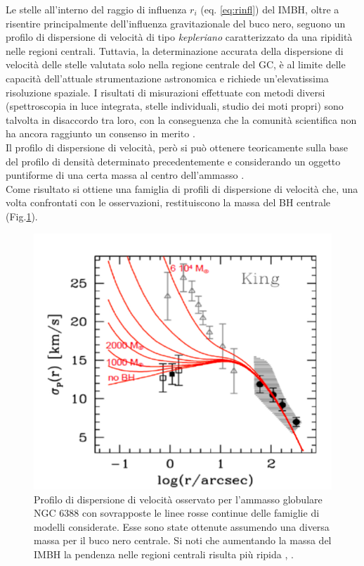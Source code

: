 Le stelle all’interno del raggio di influenza $r_{i}$ (eq. \ref{eq:rinfl}) del IMBH, oltre a risentire principalmente dell’influenza gravitazionale del buco nero, seguono un profilo di dispersione di velocità di tipo \textit{kepleriano} caratterizzato da una ripidità nelle regioni centrali. Tuttavia, la determinazione accurata della dispersione di velocità delle stelle valutata solo nella regione centrale del GC, è al limite delle capacità dell’attuale strumentazione astronomica e richiede un’elevatissima risoluzione spaziale. I risultati di misurazioni effettuate con metodi diversi (spettroscopia in luce integrata, stelle individuali, studio dei moti propri) sono talvolta in disaccordo tra loro, con la conseguenza che la comunità scientifica non ha ancora raggiunto un consenso in merito \cite{lutz1:paper}.\\
Il profilo di dispersione di velocità, però si può ottenere teoricamente sulla base del profilo di densità determinato precedentemente e considerando un oggetto puntiforme di una certa massa al centro dell’ammasso \cite{lutz:paper}.\\
Come risultato si ottiene una famiglia di profili di dispersione di velocità che, una volta confrontati con le osservazioni, restituiscono la massa del BH centrale (Fig.\ref{fig:profili_vel}).
\begin{figure}[ht]
\begin{center}
\includegraphics[width=0.6\columnwidth]{images/profili_vel.png}
\end{center}
\caption{Profilo di dispersione di velocità osservato per l'ammasso globulare NGC 6388 con sovrapposte le linee rosse continue delle famiglie di modelli considerate. Esse sono state ottenute assumendo una diversa massa per il buco nero centrale. Si noti che aumentando la massa del IMBH la pendenza nelle regioni centrali risulta più ripida \cite{Lanzoni:paper}, \cite{lutz:paper}.}
\label{fig:profili_vel}
\end{figure}

